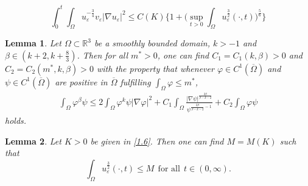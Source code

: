 \documentclass[10pt,a4paper]{amsart}
\newtheorem{lemma}{Lemma}
\begin{document}
    \begin{equation}\label{3.4}
        \int_0^{t}\int_\Omega u_\varepsilon^{-\frac3 4}v_\varepsilon|\nabla u_\varepsilon|^2\leq C(K)\bigg\{1+\bigg(\sup\limits_{t>0}\int_\Omega u_\varepsilon^{\frac3 2}(\cdot,t)\bigg)^{\frac{5}{6}}\bigg\}
    \end{equation}

\begin{lemma}\label{lemma3.4}
Let $\Omega\subset\mathbb{R}^3$ be  a smoothly bounded domain, $k>-1$ and $\beta\in (k+2,k+\frac{8}{3})$. Then for all $m^*>0$, one can find $C_1=C_1(k, \beta)>0$ and $C_2=C_2(m^*,k,\beta)>0$ with the property that whenever $\varphi\in C^1(\overline \Omega)$ and $\psi \in C^1(\overline \Omega)$ are positive %
in $\overline \Omega$ fulfilling  $\int_{\Omega}\varphi\leq m^*$,
  \begin{align}\label{3.6}
    \int_{\Omega}\varphi^{\beta}\psi\leq  2\int_{\Omega}\varphi^{k}\psi|\nabla \varphi|^2+C_1\int_\Omega\frac{|\nabla \psi|^{\frac{2\beta}{\beta-k-2}}}{\psi^{\frac{2\beta}{\beta-k-2}-1}}+C_2\int_{\Omega}\varphi \psi
\end{align} holds.
\end{lemma}

\begin{lemma}\label{lemma3.5}
 Let $K>0$ be given  in \eqref{1.6}. Then one can find $M=M(K)$ such that
    \begin{equation}\label{3.7}
        \int_\Omega u_\varepsilon^{\frac{3}{2}}(\cdot,t)\leq M~~\mbox{for all}~~t\in(0,\infty).
        \end{equation}
\end{lemma}
\end{document}
